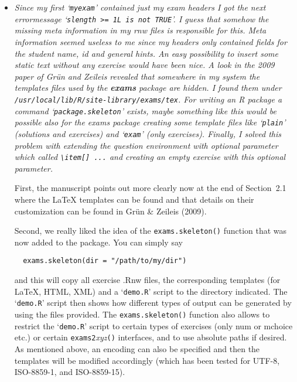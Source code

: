 \documentclass[american]{uibkletter}
\begin{document}
\begin{itemize}
We tried to look at this in more detail, using the `\verb|exams_experiments.tex|'
provided by the reviewer. However, that was not in UTF-8 encoding (anymore)
and also did not contain exercises that could be made dynamic easily. Also,
we could not compile that {\LaTeX} file without errors.

As for the encoding issue: We typically recommend to write exercises as
ASCII files (by using {\LaTeX} commands for special characters) as these can
be easily compiled on different platforms using different locale settings.
However, we tried to facilitate using different encodings. In particular,
UTF-8 now works for all \texttt{exams2}\emph{xyz}\texttt{()} interfaces. Some examples and
illustrations have been added, including support in \texttt{exams.sekelton()}.

\item {\it
Since my first `\texttt{myexam}' contained just my exam headers I got the next
errormessage `\texttt{slength >= 1L is not TRUE}'.  I guess that somehow the
missing meta information in my rnw files is responsible for this.  Meta
information seemed useless to me since my headers only contained fields
for the student name, id and general hints.  An easy possibility to insert
some static text without any exercise would have been nice. A look in the
2009 paper of Gr\"un and Zeileis revealed that somewhere in my system the
templates files used by the \textbf{exams} package are hidden.  I found them
under \texttt{/usr/local/lib/R/site-library/exams/tex}.  For writing an R package
a command `\texttt{package.skeleton}' exists, maybe something like this would be
possible also for the exams package creating some template files like
`\texttt{plain}' (solutions and exercises) and `\texttt{exam}' (only exercises). Finally, I
solved this problem with extending the question environment with optional
parameter which called \verb|\item[] ...|  and creating an empty exercise with
this optional parameter.}

First, the manuscript points out more clearly now at the end of Section~2.1
where the {\LaTeX} templates can be found and that details on their customization
can be found in Gr\"un \& Zeileis (2009).

Second, we really liked the idea of the \texttt{exams.skeleton()} function that was
now added to the package. You can simply say
\begin{verbatim}
  exams.skeleton(dir = "/path/to/my/dir")
\end{verbatim}
and this will copy all exercise .Rnw files, the corresponding templates (for
{\LaTeX}, HTML, XML) and a `\texttt{demo.R}' script to the directory indicated. The `\texttt{demo.R}'
script then shows how different types of output can be generated by using
the files provided. The \texttt{exams.skeleton()} function also allows to restrict
the `\texttt{demo.R}' script to certain types of exercises (only num or mchoice etc.)
or certain \texttt{exams2}\emph{xyz}\texttt{()} interfaces, and to use absolute paths if desired. As
mentioned above, an encoding can also be specified and then the templates
will be modified accordingly (which has been tested for UTF-8, ISO-8859-1,
and ISO-8859-15).


\end{itemize}
\end{document}
